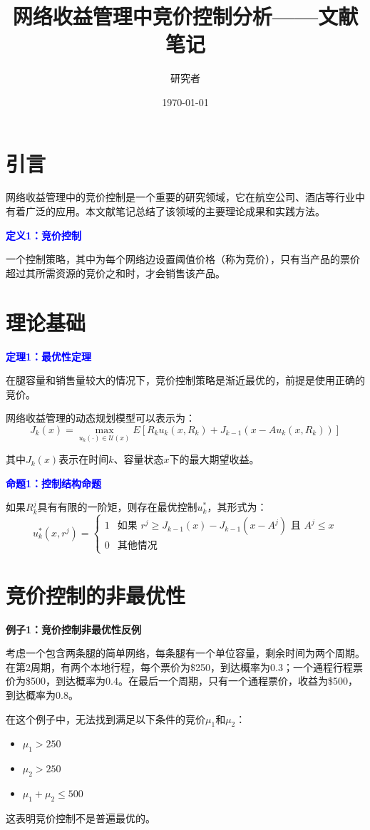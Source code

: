 \documentclass[12pt,a4paper]{article}
\title{网络收益管理中竞价控制分析——文献笔记}
\author{研究者}
\date{\today}
\begin{document}
\maketitle

\section{引言}

网络收益管理中的竞价控制是一个重要的研究领域，它在航空公司、酒店等行业中有着广泛的应用。本文献笔记总结了该领域的主要理论成果和实践方法。

\textcolor{blue}{\textbf{定义1：竞价控制}}

一个控制策略，其中为每个网络边设置阈值价格（称为竞价），只有当产品的票价超过其所需资源的竞价之和时，才会销售该产品。

\section{理论基础}

\textcolor{blue}{\textbf{定理1：最优性定理}}

在腿容量和销售量较大的情况下，竞价控制策略是渐近最优的，前提是使用正确的竞价。

网络收益管理的动态规划模型可以表示为：
\[
J_k(x) = \max_{u_k(\cdot) \in \mathcal{U}(x)} E[R_k u_k(x, R_k) + J_{k-1}(x - A u_k(x, R_k))]
\]

其中$J_k(x)$表示在时间$k$、容量状态$x$下的最大期望收益。

\textcolor{blue}{\textbf{命题1：控制结构命题}}

如果$R_k^j$具有有限的一阶矩，则存在最优控制$u_k^*$，其形式为：
\[
u_k^*(x,r^j) = \begin{cases}
1 & \text{如果 } r^j \geq J_{k-1}(x) - J_{k-1}(x - A^j) \text{ 且 } A^j \leq x \\
0 & \text{其他情况}
\end{cases}
\]

\section{竞价控制的非最优性}

\textbf{例子1：竞价控制非最优性反例}

考虑一个包含两条腿的简单网络，每条腿有一个单位容量，剩余时间为两个周期。在第2周期，有两个本地行程，每个票价为\$250，到达概率为0.3；一个通程行程票价为\$500，到达概率为0.4。在最后一个周期，只有一个通程票价，收益为\$500，到达概率为0.8。

在这个例子中，无法找到满足以下条件的竞价$\mu_1$和$\mu_2$：
\begin{itemize}
\item $\mu_1 > 250$
\item $\mu_2 > 250$  
\item $\mu_1 + \mu_2 \leq 500$
\end{itemize}
这表明竞价控制不是普遍最优的。
\end{document}
